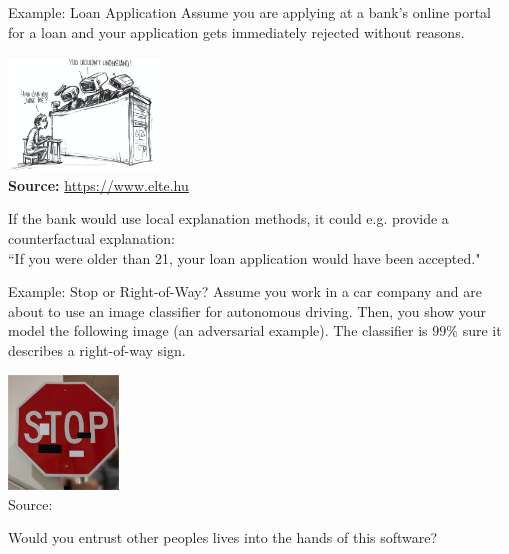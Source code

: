 \documentclass[aspectratio=169]{../latex_main/tntbeamer}  %
\begin{document}
\begin{frame}{Example: Loan Application}
Assume you are applying at a bank's online portal for a loan and your application gets immediately rejected without reasons.
	\begin{center}
		\includegraphics[width=0.3\textwidth]{figure/IntroJudge.png}\\
		{\tiny \textbf{Source:} \href{https://www.elte.hu/content/trendfordulo-az-mi-fejlesztesekben.t.19025}{https://www.elte.hu}}
	\end{center}
	If the bank would use local explanation methods, it could e.g. provide a counterfactual explanation:\\
	``If you were older than 21, your loan application would have been accepted."
\end{frame}

\begin{frame}{Example: Stop or Right-of-Way?}
Assume you work in a car company and are about to use an image classifier for autonomous driving. Then, you show your model the following image (an adversarial example). The classifier is $99\%$ sure it describes a right-of-way sign.
	\begin{center}
		\includegraphics[width=0.22\textwidth]{figure/IntroStop.jpg}\\
		{Source: }
	\end{center}
	Would you entrust other peoples lives into the hands of this software?
\end{frame}
\end{document}
